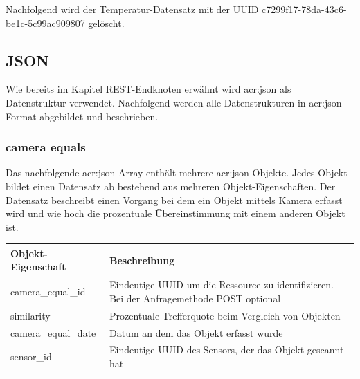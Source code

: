 Nachfolgend wird der Temperatur-Datensatz mit der UUID
c7299f17-78da-43c6-be1c-5c99ac909807 gelöscht.


\subsection{JSON}%
\label{sec:rest.json}

Wie bereits im Kapitel REST-Endknoten erwähnt wird \acrshort{acr:json} als
Datenstruktur verwendet. Nachfolgend werden alle Datenstrukturen in
\acrshort{acr:json}-Format abgebildet und beschrieben.

\subsubsection{camera equals}%
\label{sec:rest.json.camera_equals}

Das nachfolgende \acrshort{acr:json}-Array enthält mehrere
\acrshort{acr:json}-Objekte. Jedes Objekt bildet einen Datensatz ab bestehend
aus mehreren Objekt-Eigenschaften. Der Datensatz beschreibt einen Vorgang bei
dem ein Objekt mittels Kamera erfasst wird und wie hoch die prozentuale
Übereinstimmung mit einem anderen Objekt ist.

\begin{jsoncode}
\end{jsoncode}

\begin{table}[H]
  \begin{tabularx}{\textwidth}{lX}
    \textbf{Objekt-Eigenschaft} & \textbf{Beschreibung}                                                                     \\ \toprule
    camera\_equal\_id           & Eindeutige UUID um die Ressource zu identifizieren. Bei der Anfragemethode POST optional  \\
    similarity                  & Prozentuale Trefferquote beim Vergleich von Objekten                                      \\
    camera\_equal\_date         & Datum an dem das Objekt erfasst wurde                                                     \\
    sensor\_id                  & Eindeutige UUID des Sensors, der das Objekt gescannt hat                                  \\
  \end{tabularx}
\end{table}

